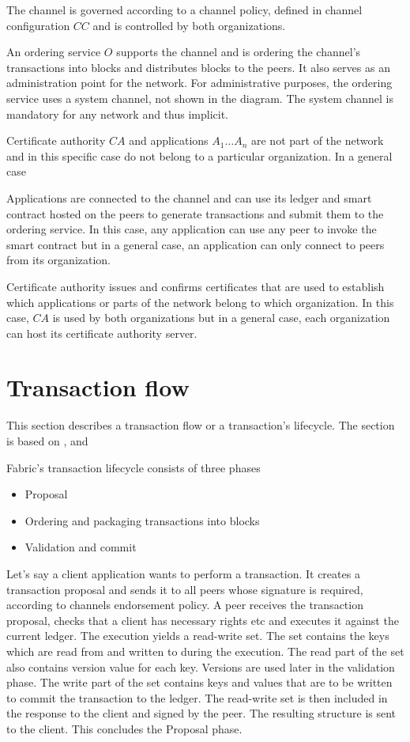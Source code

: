 The channel is governed according to a channel policy, defined in channel configuration $CC$ and is controlled by both organizations.

An ordering service $O$ supports the channel and is ordering the channel's transactions into blocks and distributes blocks to the peers. It also serves as an administration point for the network. For administrative purposes, the ordering service uses a system channel, not shown in the diagram. The system channel is mandatory for any network and thus implicit.

Certificate authority $CA$ and applications $A_{1} ... A_{n}$ are not part of the network and in this specific case do not belong to a particular organization. In a general case

Applications are connected to the channel and can use its ledger and smart contract hosted on the peers to generate transactions and submit them to the ordering service. In this case, any application can use any peer to invoke the smart contract but in a general case, an application can only connect to peers from its organization.

Certificate authority issues and confirms certificates that are used to establish which applications or parts of the network belong to which organization. In this case, $CA$ is used by both organizations but in a general case, each organization can host its certificate authority server.

\newpage

\section{Transaction flow}
\label{sec:flow}
This section describes a transaction flow or a transaction's lifecycle. The section is based on \cite{fabricdocs:flow},  \cite{fabricdocs:peer} and \cite{fabricdocs:orderer}

Fabric's transaction lifecycle consists of three phases
\begin{itemize}
  \item Proposal
  \item Ordering and packaging transactions into blocks
  \item Validation and commit
\end{itemize}

Let's say a client application wants to perform a transaction. It creates a transaction proposal and sends it to all peers whose signature is required, according to channels endorsement policy.
A peer receives the transaction proposal, checks that a client has necessary rights etc and executes it against the current ledger. The execution yields a read-write set. The set contains the keys which are read from and written to during the execution. The read part of the set also contains version value for each key. Versions are used later in the validation phase. The write part of the set contains keys and values that are to be written to commit the transaction to the ledger. The read-write set is then included in the response to the client and signed by the peer. The resulting structure is sent to the client. This concludes the Proposal phase.

